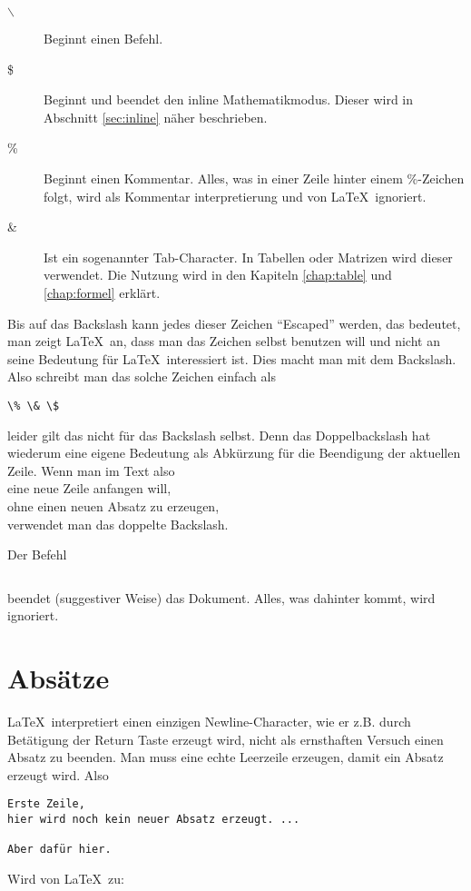 \begin{description}
\item[$\backslash$] Beginnt einen Befehl.
\item[\$] Beginnt und beendet den inline Mathematikmodus. Dieser wird in Abschnitt \ref{sec:inline} näher beschrieben.
\item[\%] Beginnt einen Kommentar. Alles, was in einer Zeile hinter einem \%-Zeichen folgt, wird als Kommentar interpretierung und von \LaTeX\ ignoriert.
\item[\&] Ist ein sogenannter Tab-Character. In Tabellen oder Matrizen wird dieser verwendet. Die Nutzung wird in den Kapiteln \ref{chap:table} und \ref{chap:formel} erklärt.
\end{description}

Bis auf das Backslash kann jedes dieser Zeichen "`Escaped"' werden, das bedeutet, man zeigt \LaTeX\ an, dass man das Zeichen selbst benutzen will und nicht an seine Bedeutung für \LaTeX\ interessiert ist. Dies macht man mit dem Backslash. Also schreibt man das solche Zeichen einfach als 
\begin{verbatim}
\% \& \$
\end{verbatim}
leider gilt das nicht für das Backslash selbst. Denn das Doppelbackslash hat wiederum eine eigene Bedeutung als Abkürzung für die Beendigung der aktuellen Zeile. Wenn man im Text also \\
eine neue Zeile anfangen will, \\
ohne einen neuen Absatz zu erzeugen, \\
verwendet man das doppelte Backslash.

Der Befehl 
\begin{verbatim}

\end{verbatim}
beendet (suggestiver Weise) das Dokument. Alles, was dahinter kommt, wird ignoriert. 


\section{Absätze}

\LaTeX\ interpretiert einen einzigen Newline-Character, wie er z.B. durch Betätigung der Return Taste erzeugt wird, nicht als ernsthaften Versuch einen Absatz zu beenden. Man muss eine echte Leerzeile erzeugen, damit ein Absatz erzeugt wird. Also
\begin{verbatim}
Erste Zeile,
hier wird noch kein neuer Absatz erzeugt. ...

Aber dafür hier.
\end{verbatim}
Wird von \LaTeX\ zu:

